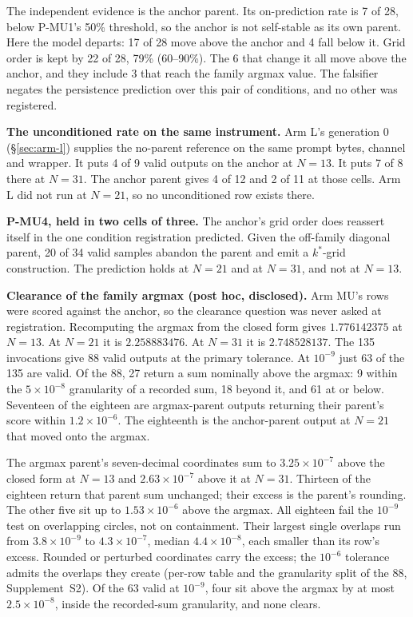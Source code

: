 The independent evidence is the anchor parent. Its on-prediction rate is 7 of 28,
below P-MU1's 50\% threshold, so the anchor is not self-stable as its own parent. Here
the model departs: 17 of 28 move above the anchor and 4 fall below it. Grid order is kept by
22 of 28, 79\% (60--90\%). The 6 that change it all move above the anchor, and they include
3 that reach the family argmax value. The falsifier negates the persistence prediction
over this pair of conditions, and no other was registered.

\textbf{The unconditioned rate on the same instrument.} Arm L's generation 0
(\S\ref{sec:arm-l}) supplies the no-parent reference on the same prompt bytes, channel and
wrapper. It puts 4 of 9 valid outputs on the anchor at $N = 13$. It puts 7 of 8
there at $N = 31$. The anchor parent gives 4 of 12 and 2 of 11 at those cells. Arm
L did not run at $N = 21$, so no unconditioned row exists there.

\textbf{P-MU4, held in two cells of three.} The anchor's grid order does reassert itself in the one
condition registration predicted. Given the off-family diagonal parent, 20 of 34
valid samples abandon the parent and emit a $k^*$-grid construction. The prediction holds
at $N = 21$ and at $N = 31$, and not
at $N = 13$.



\textbf{Clearance of the family argmax (post hoc, disclosed).} Arm MU's rows were scored
against the anchor, so the clearance question was never asked at registration. Recomputing
the argmax from the closed form gives $1.776142375$ at $N = 13$. At $N = 21$ it is
$2.258883476$. At $N = 31$ it is $2.748528137$. The 135 invocations give 88 valid outputs at
the primary tolerance. At $10^{-9}$ just 63 of the 135 are valid. Of the 88, 27 return a
sum nominally above the argmax: 9 within the $5\times10^{-8}$ granularity of a recorded sum,
18 beyond it, and 61 at or below. Seventeen of the eighteen are argmax-parent outputs
returning their parent's score within $1.2\times10^{-6}$. The eighteenth is the anchor-parent output at
$N = 21$ that moved onto the argmax.

The argmax parent's seven-decimal coordinates sum to $3.25\times10^{-7}$ above the
closed form at $N = 13$ and $2.63\times10^{-7}$ above it at $N = 31$. Thirteen of the
eighteen return that parent sum unchanged; their excess is the parent's rounding. The other
five sit up to $1.53\times10^{-6}$ above the argmax. All eighteen fail the $10^{-9}$ test on
overlapping circles, not on containment. Their largest single overlaps run from
$3.8\times10^{-9}$ to $4.3\times10^{-7}$, median $4.4\times10^{-8}$, each smaller than its
row's excess. Rounded or perturbed coordinates carry the excess; the $10^{-6}$ tolerance
admits the overlaps they create (per-row table and the granularity split of the 88,
Supplement~S2). Of the 63 valid at $10^{-9}$, four sit above the argmax by at most
$2.5\times10^{-8}$, inside the recorded-sum granularity, and none clears.
